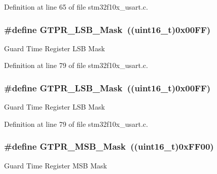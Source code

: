 Definition at line 65 of file stm32f10x\+\_\+usart.\+c.

\subsubsection[{\texorpdfstring{G\+T\+P\+R\+\_\+\+L\+S\+B\+\_\+\+Mask}{GTPR_LSB_Mask}}]{\setlength{\rightskip}{0pt plus 5cm}\#define G\+T\+P\+R\+\_\+\+L\+S\+B\+\_\+\+Mask~(({\bf uint16\+\_\+t})0x00\+F\+F)}\hypertarget{group___u_s_a_r_t___private___defines_ga2fe593d0c308e2245bb66905930b3ebb}{}\label{group___u_s_a_r_t___private___defines_ga2fe593d0c308e2245bb66905930b3ebb}
Guard Time Register L\+SB Mask 

Definition at line 79 of file stm32f10x\+\_\+usart.\+c.

\subsubsection[{\texorpdfstring{G\+T\+P\+R\+\_\+\+L\+S\+B\+\_\+\+Mask}{GTPR_LSB_Mask}}]{\setlength{\rightskip}{0pt plus 5cm}\#define G\+T\+P\+R\+\_\+\+L\+S\+B\+\_\+\+Mask~(({\bf uint16\+\_\+t})0x00\+F\+F)}\hypertarget{group___u_s_a_r_t___private___defines_ga2fe593d0c308e2245bb66905930b3ebb}{}\label{group___u_s_a_r_t___private___defines_ga2fe593d0c308e2245bb66905930b3ebb}
Guard Time Register L\+SB Mask 

Definition at line 79 of file stm32f10x\+\_\+usart.\+c.

\subsubsection[{\texorpdfstring{G\+T\+P\+R\+\_\+\+M\+S\+B\+\_\+\+Mask}{GTPR_MSB_Mask}}]{\setlength{\rightskip}{0pt plus 5cm}\#define G\+T\+P\+R\+\_\+\+M\+S\+B\+\_\+\+Mask~(({\bf uint16\+\_\+t})0x\+F\+F00)}\hypertarget{group___u_s_a_r_t___private___defines_ga405b4222892bafdf1d084de5efd24d70}{}\label{group___u_s_a_r_t___private___defines_ga405b4222892bafdf1d084de5efd24d70}
Guard Time Register M\+SB Mask 

